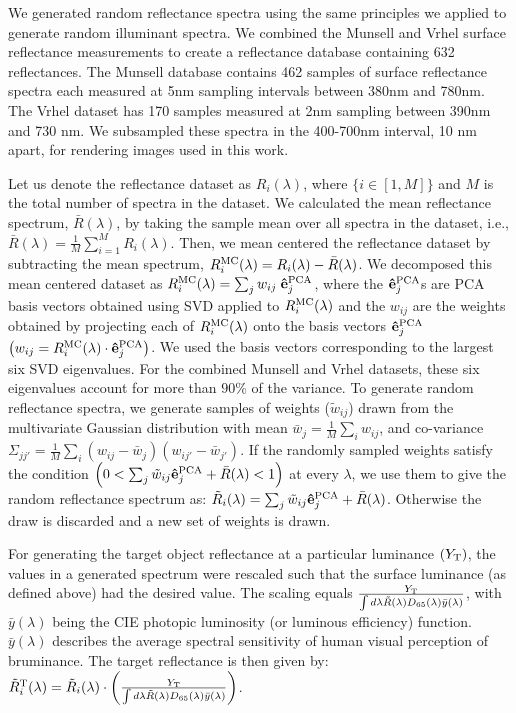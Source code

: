 \documentclass{jov}
\begin{document}
We generated random reflectance spectra using the same principles we applied to generate random illuminant spectra.
We combined the Munsell \cite{kelly1943tristimulus} and Vrhel \cite{vrhel1994measurement} surface reflectance 
measurements to create a reflectance database containing 632 reflectances. The Munsell database contains 462 samples of surface reflectance spectra each measured at 5nm sampling intervals between 380nm and 780nm. The Vrhel dataset has 170 samples measured at 2nm sampling between 390nm and 730 nm. We subsampled these spectra in the 400-700nm interval, 10 nm apart, for rendering images used in this work.

Let us denote the reflectance dataset as $R_i(\lambda)$, where $\{i \in [1,M]\}$ 
and $M$ is the total number of spectra in the dataset. 
We calculated the mean reflectance spectrum,
$\bar{R}(\lambda)$, by taking the sample mean over all spectra in the dataset, i.e.,
$\bar{R}(\lambda) = \frac{1}{M} \sum_{i=1}^M R_i(\lambda)$. Then, we mean centered 
the reflectance dataset by subtracting the mean spectrum, $R_i^{\rm MC}(\lambda) =  R_i(\lambda)-\bar{R}(\lambda)$. 
We decomposed this mean centered dataset as $R_i^{\rm MC}(\lambda) = \sum_j{w_{ij} \; {\bf \hat{e}}_j^{\rm PCA}}$, where
the ${\bf \hat{e}}_j^{\rm PCA}$s are PCA basis vectors obtained using SVD applied to $R_i^{\rm MC}(\lambda)$
and the $w_{ij}$ are the weights obtained by projecting each of $R_i^{\rm MC}(\lambda)$ onto the basis vectors ${\bf \hat{e}}_j^{\rm PCA}$ 
$\left( w_{ij} = R_i^{\rm MC}(\lambda)\cdot {\bf \hat{e}}_j^{\rm PCA}\right)$. 
We used the basis vectors corresponding to the largest six SVD eigenvalues. 
For the combined Munsell and Vrhel datasets, these six eigenvalues account for 
more than $90\%$ of the variance. 
To generate random reflectance spectra, we generate samples of weights ($\tilde{w}_{ij}$) drawn from the multivariate Gaussian 
distribution with mean $\bar{w}_j = \frac{1}{M}\sum_i w_{ij}$, 
and co-variance $\Sigma_{jj'} = \frac{1}{M} \sum_i \left(w_{ij} -\bar{w}_j\right)\left(w_{ij'} -\bar{w}_{j'}\right) $. If the randomly sampled weights satisfy the condition $\left( 0 < \sum_j \tilde{w}_{ij}{\bf \hat{e}}_j^{\rm PCA} + \bar{R}(\lambda)<1\right) $ at every $\lambda$, we use them to give the random reflectance spectrum as: $\tilde{R}_i(\lambda) =\sum_j \tilde{w}_{ij}{\bf \hat{e}}_j^{\rm PCA} + \bar{R}(\lambda)$.  Otherwise the draw is discarded and a new set of weights is drawn.

For generating the target object reflectance at a particular luminance $(Y_{\rm T})$, the values in a generated spectrum were 
rescaled such that the surface luminance (as defined above) had the desired value.
The scaling equals $\frac{Y_{\rm T}}{\int d\lambda \tilde{R}(\lambda) D_{65}(\lambda) \bar{y}(\lambda)}$, with $\bar{y}(\lambda)$ being the CIE photopic luminosity (or luminous efficiency) function. 
$\bar{y}(\lambda)$ describes the average spectral sensitivity of human visual 
perception of bruminance. The target reflectance is then given by: $\tilde{R}^{\rm T}_i(\lambda) =\tilde{R}_i(\lambda) \cdot\left(\frac{Y_{\rm T}}{\int d\lambda \tilde{R}(\lambda) D_{65}(\lambda) \bar{y}(\lambda)}\right)$.
\end{document}
